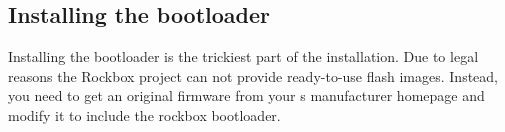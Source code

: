 \subsection{Installing the bootloader}
  Installing the bootloader is the trickiest part of the installation.
  Due to legal reasons the Rockbox project can not provide ready-to-use flash
  images. Instead, you need to get an original firmware from your \dap s
  manufacturer homepage and modify it to include the rockbox bootloader.
  
 